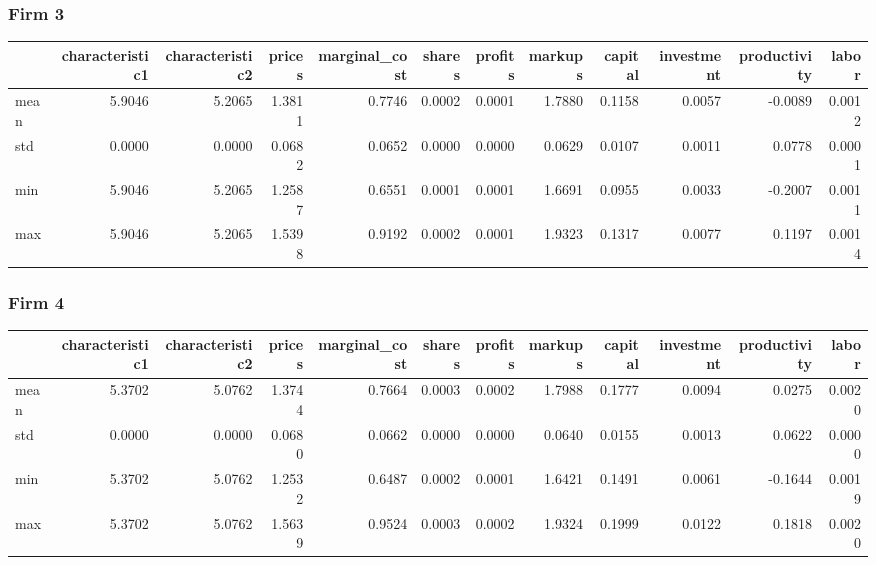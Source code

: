  \subsubsection*{Firm 3}
\begin{tabular}{lrrrrrrrrrrr}
\toprule
{} &  characteristic1 &  characteristic2 &  prices &  marginal\_cost &  shares &  profits &  markups &  capital &  investment &  productivity &  labor \\
\midrule
mean &           5.9046 &           5.2065 &  1.3811 &         0.7746 &  0.0002 &   0.0001 &   1.7880 &   0.1158 &      0.0057 &       -0.0089 & 0.0012 \\
std  &           0.0000 &           0.0000 &  0.0682 &         0.0652 &  0.0000 &   0.0000 &   0.0629 &   0.0107 &      0.0011 &        0.0778 & 0.0001 \\
min  &           5.9046 &           5.2065 &  1.2587 &         0.6551 &  0.0001 &   0.0001 &   1.6691 &   0.0955 &      0.0033 &       -0.2007 & 0.0011 \\
max  &           5.9046 &           5.2065 &  1.5398 &         0.9192 &  0.0002 &   0.0001 &   1.9323 &   0.1317 &      0.0077 &        0.1197 & 0.0014 \\
\bottomrule
\end{tabular}


 \subsubsection*{Firm 4}
\begin{tabular}{lrrrrrrrrrrr}
\toprule
{} &  characteristic1 &  characteristic2 &  prices &  marginal\_cost &  shares &  profits &  markups &  capital &  investment &  productivity &  labor \\
\midrule
mean &           5.3702 &           5.0762 &  1.3744 &         0.7664 &  0.0003 &   0.0002 &   1.7988 &   0.1777 &      0.0094 &        0.0275 & 0.0020 \\
std  &           0.0000 &           0.0000 &  0.0680 &         0.0662 &  0.0000 &   0.0000 &   0.0640 &   0.0155 &      0.0013 &        0.0622 & 0.0000 \\
min  &           5.3702 &           5.0762 &  1.2532 &         0.6487 &  0.0002 &   0.0001 &   1.6421 &   0.1491 &      0.0061 &       -0.1644 & 0.0019 \\
max  &           5.3702 &           5.0762 &  1.5639 &         0.9524 &  0.0003 &   0.0002 &   1.9324 &   0.1999 &      0.0122 &        0.1818 & 0.0020 \\
\bottomrule
\end{tabular}


